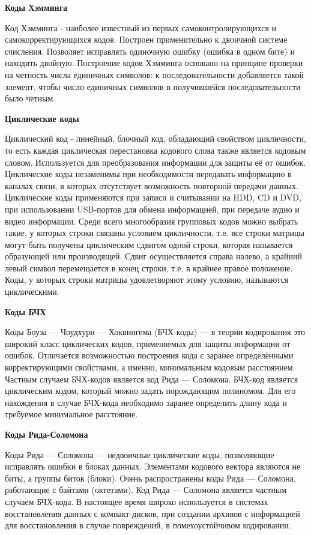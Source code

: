 \documentclass[a4paper,14pt]{extarticle}
\begin{document}
\textbf{Коды Хэмминга}

Код Хэмминга - наиболее известный из первых самоконтролирующихся и самокорректирующихся кодов. Построен применительно к двоичной системе счисления. Позволяет исправлять одиночную ошибку (ошибка в одном бите) и находить двойную. Построение кодов Хэмминга основано на принципе проверки на четность числа единичных символов: к последовательности добавляется такой элемент, чтобы число единичных символов в получившейся последовательности было четным.

\textbf{Циклические коды}

Циклический код - линейный, блочный код, обладающий свойством цикличности, то есть каждая циклическая перестановка кодового слова также является кодовым словом. Используется для преобразования информации для защиты её от ошибок. Циклические коды незаменимы при необходимости передавать информацию в каналах связи, в которых отсутствует возможность повторной передачи данных. Циклические коды применяются при записи и считывании на HDD, CD и DVD, при использовании USB-портов для обмена информацией, при передаче аудио и видео информации. Среди всего многообразия групповых кодов можно выбрать такие, у которых строки связаны условием цикличности, т.е. все строки матрицы могут быть получены циклическим сдвигом одной строки, которая называется образующей или производящей. Сдвиг осуществляется справа налево, а крайний левый символ перемещается в конец строки, т.е. в крайнее правое положение. Коды, у которых строки матрицы удовлетворяют этому условию, называются циклическими.

\textbf{Коды БЧХ}

Коды Боуза — Чоудхури — Хоквингема (БЧХ-коды) — в теории кодирования это широкий класс циклических кодов, применяемых для защиты информации от ошибок. Отличается возможностью построения кода с заранее определёнными корректирующими свойствами, а именно, минимальным кодовым расстоянием. Частным случаем БЧХ-кодов является код Рида — Соломона. БЧХ-код является циклическим кодом, который можно задать порождающим полиномом. Для его нахождения в случае БЧХ-кода необходимо заранее определить длину кода и требуемое минимальное расстояние.

\textbf{Коды Рида-Соломона}

Коды Рида — Соломона — недвоичные циклические коды, позволяющие исправлять ошибки в блоках данных. Элементами кодового вектора являются не биты, а группы битов (блоки). Очень распространены коды Рида — Соломона, работающие с байтами (октетами).
Код Рида — Соломона является частным случаем БЧХ-кода.
В настоящее время широко используется в системах восстановления данных с компакт-дисков, при создании архивов с информацией для восстановления в случае повреждений, в помехоустойчивом кодировании.
\end{document}
